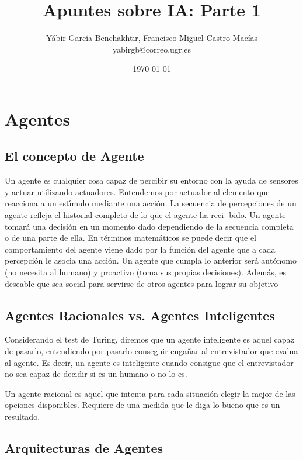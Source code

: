 \documentclass[12pt]{article}
\author{Yábir García Benchakhtir, Francisco Miguel Castro Macías\\yabirgb@correo.ugr.es}
\date{\today}
\title{Apuntes sobre IA: Parte 1}
\begin{document}
\setlength{\parindent}{0cm}
\setlength{\parskip}{3mm}

\maketitle

\section{Agentes}

\subsection{El concepto de Agente}

Un agente es cualquier cosa capaz de percibir su entorno con la ayuda
de sensores y actuar utilizando actuadores. Entendemos por actuador al
elemento que reacciona a un estı́mulo mediante una acción.  La
secuencia de percepciones de un agente refleja el historial completo
de lo que el agente ha reci- bido. Un agente tomará una decisión en un
momento dado dependiendo de la secuencia completa o de una parte de
ella. En términos matemáticos se puede decir que el comportamiento del
agente viene dado por la función del agente que a cada percepción le
asocia una acción.  Un agente que cumpla lo anterior será autónomo (no
necesita al humano) y proactivo (toma sus propias decisiones). Además,
es deseable que sea social para servirse de otros agentes para lograr
su objetivo

\subsection{Agentes Racionales vs. Agentes Inteligentes}

Considerando el test de Turing, diremos que un agente inteligente es
aquel capaz de pasarlo, entendiendo por pasarlo conseguir engañar al
entrevistador que evalua al agente. Es decir, un agente es inteligente
cuando consigue que el entrevistador no sea capaz de decidir si es un
humano o no lo es.

Un agente racional es aquel que intenta para cada situación elegir la
mejor de las opciones disponibles. Requiere de una medida que le diga
lo bueno que es un resultado.

\subsection{Arquitecturas de Agentes}
\end{document}
